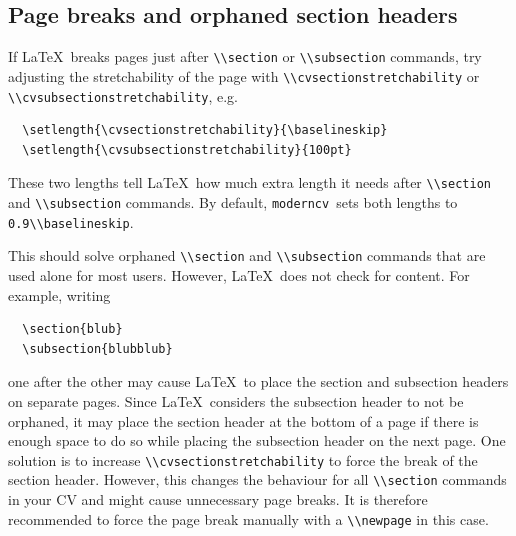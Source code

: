 \documentclass[a4paper, 11pt]{article}
\newcommand{\code}[1]{\lstinline!#1!}
\newcommand{\moderncv}{\code{moderncv}}
\newcommand{\Moderncv}{\moderncv~}
\newcommand{\Latex}{\LaTeX~}
\begin{document}
\subsection{Page breaks and orphaned section headers}
If \Latex breaks pages just after \code{\\section} or \code{\\subsection} commands, try adjusting the stretchability of the page with \code{\\cvsectionstretchability} or \code{\\cvsubsectionstretchability}, e.g.
\begin{lstlisting}
  \setlength{\cvsectionstretchability}{\baselineskip}
  \setlength{\cvsubsectionstretchability}{100pt}
\end{lstlisting}
These two lengths tell \Latex how much extra length it needs after \code{\\section} and \code{\\subsection} commands.
By default, \Moderncv sets both lengths to \code{0.9\\baselineskip}.

This should solve orphaned \code{\\section} and \code{\\subsection} commands that are used alone for most users.
However, \Latex does not check for content.
For example, writing
\begin{lstlisting}
  \section{blub}
  \subsection{blubblub}
\end{lstlisting}
one after the other may cause \Latex to place the section and subsection headers on separate pages.
Since \Latex considers the subsection header to not be orphaned, it may place the section header at the bottom of a page if there is enough space to do so while placing the subsection header on the next page.
One solution is to increase \code{\\cvsectionstretchability} to force the break of the section header.
However, this changes the behaviour for all \code{\\section} commands in your CV and might cause unnecessary page breaks.
It is therefore recommended to force the page break manually with a \code{\\newpage} in this case.
\end{document}
